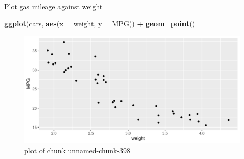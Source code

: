 \documentclass[
  ignorenonframetext,
]{beamer}
\newenvironment{Shaded}{\begin{snugshade}}{\end{snugshade}}
\newcommand{\DataTypeTok}[1]{\textcolor[rgb]{0.13,0.29,0.53}{#1}}
\newcommand{\KeywordTok}[1]{\textcolor[rgb]{0.13,0.29,0.53}{\textbf{#1}}}
\newcommand{\NormalTok}[1]{#1}
\newcommand{\OperatorTok}[1]{\textcolor[rgb]{0.81,0.36,0.00}{\textbf{#1}}}
\newcommand{\StringTok}[1]{\textcolor[rgb]{0.31,0.60,0.02}{#1}}
\begin{document}
\begin{frame}[fragile]{Plot gas mileage against weight}
\protect\hypertarget{plot-gas-mileage-against-weight}{}

\begin{Shaded}
\begin{Highlighting}[]
\KeywordTok{ggplot}\NormalTok{(cars, }\KeywordTok{aes}\NormalTok{(}\DataTypeTok{x =}\NormalTok{ weight, }\DataTypeTok{y =}\NormalTok{ MPG)) }\OperatorTok{+}
\StringTok{  }\KeywordTok{geom_point}\NormalTok{()}
\end{Highlighting}
\end{Shaded}

\begin{figure}
\centering
\includegraphics{figure/unnamed-chunk-398-1.pdf}
\caption{plot of chunk unnamed-chunk-398}
\end{figure}

\end{frame}
\end{document}
